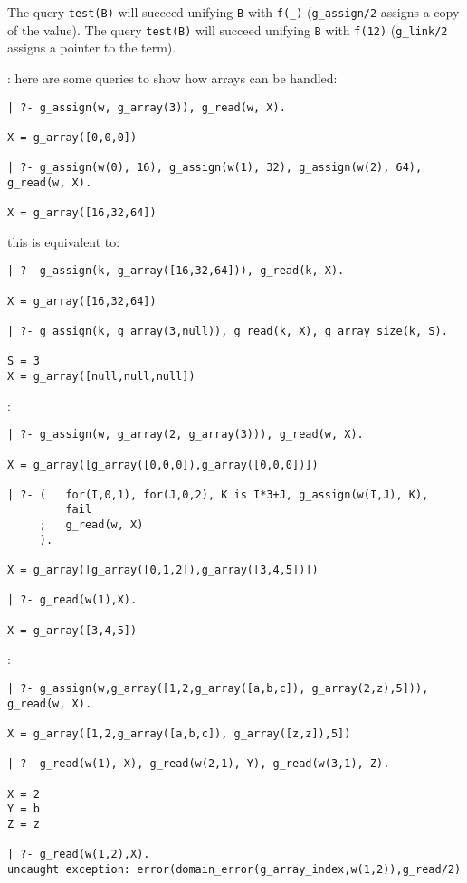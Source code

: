 The query \texttt{test(B)} will succeed unifying \texttt{B} with
\texttt{f(\_)} (\texttt{g\_assign/2} assigns a copy of the value). The query
\texttt{test(B)} will succeed unifying \texttt{B} with \texttt{f(12)}
(\texttt{g\_link/2} assigns a pointer to the term).

: here are some queries to show how arrays
can be handled:

\begin{Indentation}
\begin{verbatim}
| ?- g_assign(w, g_array(3)), g_read(w, X).

X = g_array([0,0,0])

| ?- g_assign(w(0), 16), g_assign(w(1), 32), g_assign(w(2), 64), g_read(w, X).

X = g_array([16,32,64])
\end{verbatim}
\end{Indentation}

this is equivalent to:

\begin{Indentation}
\begin{verbatim}
| ?- g_assign(k, g_array([16,32,64])), g_read(k, X).

X = g_array([16,32,64])

| ?- g_assign(k, g_array(3,null)), g_read(k, X), g_array_size(k, S).

S = 3
X = g_array([null,null,null])
\end{verbatim}
\end{Indentation}

:

\begin{Indentation}
\begin{verbatim}
| ?- g_assign(w, g_array(2, g_array(3))), g_read(w, X).

X = g_array([g_array([0,0,0]),g_array([0,0,0])])

| ?- (   for(I,0,1), for(J,0,2), K is I*3+J, g_assign(w(I,J), K),
         fail
     ;   g_read(w, X)
     ).

X = g_array([g_array([0,1,2]),g_array([3,4,5])])

| ?- g_read(w(1),X).

X = g_array([3,4,5])
\end{verbatim}
\end{Indentation}

:

\begin{Indentation}
\begin{verbatim}
| ?- g_assign(w,g_array([1,2,g_array([a,b,c]), g_array(2,z),5])), g_read(w, X).

X = g_array([1,2,g_array([a,b,c]), g_array([z,z]),5])

| ?- g_read(w(1), X), g_read(w(2,1), Y), g_read(w(3,1), Z).

X = 2
Y = b
Z = z

| ?- g_read(w(1,2),X).
uncaught exception: error(domain_error(g_array_index,w(1,2)),g_read/2)
\end{verbatim}
\end{Indentation}

